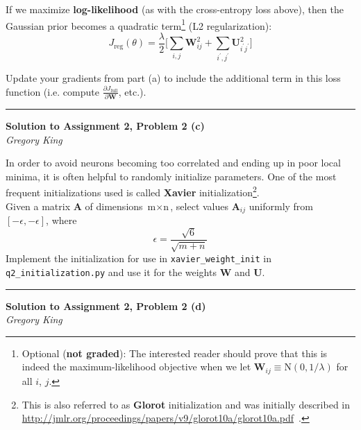 \documentclass[letter,12pt]{article}
\newcommand{\myhwtitle}[3]
{\begin{center}
{\large {\bf Solution to Assignment {#1}, Problem {#2}}}\\
\medskip
{\it {#3}} %
\end{center}}
\newcommand{\solutionsAuthor}{Gregory King}
\begin{document}
\noindent If we maximize \textbf{log-likelihood} (as with the cross-entropy loss above), then the Gaussian prior becomes a quadratic term\footnote{Optional (\textbf{not graded}): The interested reader should prove that this is indeed the maximum-likelihood objective when we let ${\boldsymbol W}_{ij} \equiv \textrm{N}(0, 1/\lambda)$ for all $i$, $j$.} (L2 regularization):
\begin{equation}
J_{\textrm{reg}}(\theta) = \frac{\lambda}{2}\big[\sum_{i,j}{\boldsymbol W}^{2}_{ij} + \sum_{i^{\prime},j^{\prime}}{\boldsymbol U}^{2}_{i^{\prime}j^{\prime}} \big]
\end{equation}

\noindent Update your gradients from part (a) to include the additional term in this loss function (i.e. compute $\frac{\partial J_{\textrm{full}}}{\partial{\boldsymbol W}}$, etc.).\vspace{5mm}

\noindent\rule{\textwidth}{0.4pt}

\clearpage

\myhwtitle{2}{2 (c)}{\solutionsAuthor}

\bigskip

\noindent In order to avoid neurons becoming too correlated and ending up in poor local minima, it is often helpful to randomly initialize parameters. One of the most frequent initializations used is called \textbf{Xavier} initialization\footnote{This is also referred to as \textbf{Glorot} initialization and was initially described in \url{http://jmlr.org/proceedings/papers/v9/glorot10a/glorot10a.pdf}~.}.\\

\noindent Given a matrix ${\boldsymbol A}$ of dimensions $\textrm{m}\times\textrm{n}$, select values ${\boldsymbol A}_{ij}$ uniformly from $[-\epsilon,-\epsilon]$, where\\
\begin{equation}
\epsilon = \frac{\sqrt{6}}{\sqrt{m+n}}
\end{equation}
Implement the initialization for use in \texttt{xavier\_weight\_init} in \texttt{q2\_initialization.py} and use it for the weights ${\boldsymbol W}$ and ${\boldsymbol U}$.

\vspace{5mm}
\noindent\rule{\textwidth}{0.4pt}

\clearpage

\myhwtitle{2}{2 (d)}{\solutionsAuthor}

\bigskip
\end{document}
